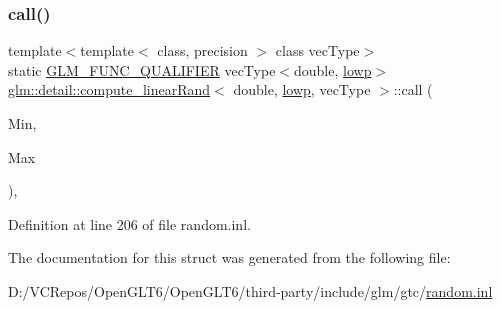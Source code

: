 \subsubsection{\texorpdfstring{call()}{call()}}
{\footnotesize\ttfamily template$<$template$<$ class, precision $>$ class vec\+Type$>$ \\
static \mbox{\hyperlink{setup_8hpp_a33fdea6f91c5f834105f7415e2a64407}{G\+L\+M\+\_\+\+F\+U\+N\+C\+\_\+\+Q\+U\+A\+L\+I\+F\+I\+ER}} vec\+Type$<$double, \mbox{\hyperlink{namespaceglm_a0f04f086094c747d227af4425893f545ae161af3fc695e696ce3bf69f7332bc2d}{lowp}}$>$ \mbox{\hyperlink{structglm_1_1detail_1_1compute__linear_rand}{glm\+::detail\+::compute\+\_\+linear\+Rand}}$<$ double, \mbox{\hyperlink{namespaceglm_a0f04f086094c747d227af4425893f545ae161af3fc695e696ce3bf69f7332bc2d}{lowp}}, vec\+Type $>$\+::call (\begin{DoxyParamCaption}\item[{vec\+Type$<$ double, \mbox{\hyperlink{namespaceglm_a0f04f086094c747d227af4425893f545ae161af3fc695e696ce3bf69f7332bc2d}{lowp}} $>$ const \&}]{Min,  }\item[{vec\+Type$<$ double, \mbox{\hyperlink{namespaceglm_a0f04f086094c747d227af4425893f545ae161af3fc695e696ce3bf69f7332bc2d}{lowp}} $>$ const \&}]{Max }\end{DoxyParamCaption})\hspace{0.3cm}{\ttfamily [inline]}, {\ttfamily [static]}}



Definition at line 206 of file random.\+inl.



The documentation for this struct was generated from the following file\+:\begin{DoxyCompactItemize}
\item 
D\+:/\+V\+C\+Repos/\+Open\+G\+L\+T6/\+Open\+G\+L\+T6/third-\/party/include/glm/gtc/\mbox{\hyperlink{random_8inl}{random.\+inl}}\end{DoxyCompactItemize}
